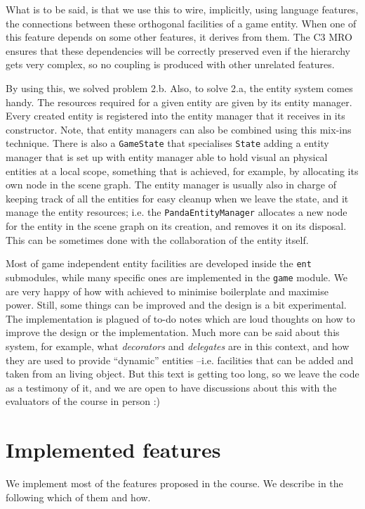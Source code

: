 \documentclass[a4paper,10pt]{article}
\begin{document}
What is to be said, is that we use this to wire, implicitly, using
language features, the connections between these orthogonal
facilities of a game entity. When one of this feature depends on some
other features, it derives from them. The C3 MRO ensures that these
dependencies will be correctly preserved even if the hierarchy gets
very complex, so no coupling is produced with other unrelated
features.

By using this, we solved problem 2.b. Also, to solve 2.a, the entity
system comes handy. The resources required for a given entity are
given by its entity manager. Every created entity is registered into
the entity manager that it receives in its constructor. Note, that
entity managers can also be combined using this mix-ins
technique. There is also a \texttt{GameState} that specialises
\texttt{State} adding a entity manager that is set up with entity
manager able to hold visual an physical entities at a local scope,
something that is achieved, for example, by allocating its own node in
the scene graph. The entity manager is usually also in charge of
keeping track of all the entities for easy cleanup when we leave the
state, and it manage the entity resources; i.e. the
\texttt{PandaEntityManager} allocates a new node for the entity in the
scene graph on its creation, and removes it on its disposal. This can
be sometimes done with the collaboration of the entity itself.

Most of game independent entity facilities are developed inside the
\texttt{ent} submodules, while many specific ones are implemented in
the \texttt{game} module. We are very happy of how with achieved to
minimise boilerplate and maximise power. Still, some things can be
improved and the design is a bit experimental. The implementation is
plagued of to-do notes which are loud thoughts on how to improve the
design or the implementation. Much more can be said about this system,
for example, what \emph{decorators} and \emph{delegates} are in this
context, and how they are used to provide ``dynamic'' entities
--i.e. facilities that can be added and taken from an living
object. But this text is getting too long, so we leave the code as a
testimony of it, and we are open to have discussions about this with
the evaluators of the course in person :)

\section{Implemented features}

We implement most of the features proposed in the course. We describe
in the following which of them and how.
\end{document}
